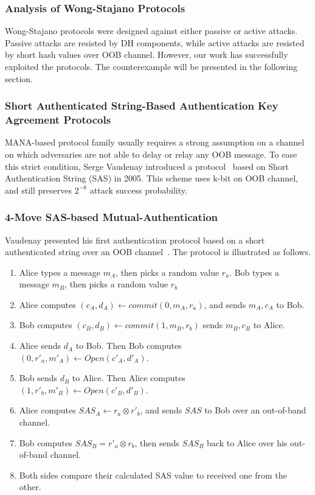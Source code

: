 \subsubsection*{Analysis of Wong-Stajano Protocols}

Wong-Stajano protocols were designed against either passive or active attacks. Passive attacks are resisted by DH components, while active attacks are resisted by short hash values over OOB channel. However, our work has successfully exploited the protocols. The counterexample will be presented in the following section. 

\subsubsection{Short Authenticated String-Based Authentication Key Agreement Protocols}

MANA-based protocol family usually requires a strong assumption on a channel on which adversaries are not able to delay or relay any OOB message. To ease this strict condition, Serge Vaudenay introduced a protocol~\cite{Vaudenay:2005qa} based on Short Authentication String (SAS) in 2005. This scheme uses k-bit on OOB channel, and still preserves $2^{-k}$ attack success probability.

\subsubsection*{4-Move SAS-based Mutual-Authentication}

Vaudenay presented his first authentication protocol based on a short authenticated string over an OOB channel~\cite{Vaudenay:2005qa}. The protocol is illustrated as follows.

\begin{enumerate}
\item Alice types a message $m_A$, then picks a random value $r_a$. Bob types a message $m_B$, then picks a random value $r_b$
\item Alice computes $(c_A,d_A) \leftarrow commit(0,m_A,r_a)$, and sends $m_A, c_A$ to Bob.
\item Bob computes $(c_B,d_B) \leftarrow commit(1,m_B,r_b)$ sends $m_B, c_B$ to Alice.
\item Alice sends $d_A$ to Bob. Then Bob computes $(0,r'_a,m'_A) \leftarrow Open(c'_A,d'_A)$. 
\item Bob sends $d_B$ to Alice. Then Alice computes $(1,r'_b,m'_B) \leftarrow Open(c'_B,d'_B)$. 
\item Alice computes $SAS_A \leftarrow r_a \otimes r'_b$, and sends $SAS$ to Bob over an out-of-band channel. 
\item Bob computes $SAS_B = r'_a \otimes r_b$, then sends $SAS_B$ back to Alice over his out-of-band channel. 
\item Both sides compare their calculated SAS value to received one from the other. 
\end{enumerate}

